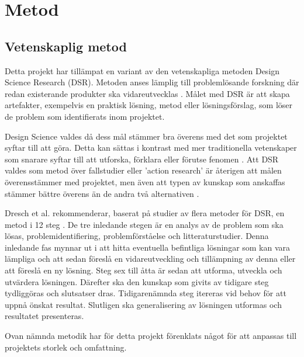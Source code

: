 \section{Metod} %
\label{sec:metod}
    
    \subsection{Vetenskaplig metod} %
    \label{sub:vetenskaplig_metod}
    	Detta projekt har tillämpat en variant av den vetenskapliga metoden Design Science Research (DSR). Metoden anses lämplig till problemlösande forskning där redan existerande produkter ska vidareutvecklas \cite{dsr}. Målet med DSR är att skapa artefakter, exempelvis en praktisk lösning, metod eller lösningsförslag, som löser de problem som identifierats inom projektet. \bigskip

        Design Science valdes då dess mål stämmer bra överens med det som projektet syftar till att göra. Detta kan sättas i kontrast med mer traditionella vetenskaper som snarare syftar till att utforska, förklara eller förutse fenomen \cite[s.~13]{dsr}. Att DSR valdes som metod över fallstudier eller 'action research' är återigen att målen överensstämmer med projektet, men även att typen av kunskap som anskaffas stämmer bättre överens än de andra två alternativen \cite[s.~95]{dsr}.\bigskip

    	Dresch et al. rekommenderar, baserat på studier av flera metoder för DSR, en metod i 12 steg \cite[s.~118--126]{dsr}. De tre inledande stegen är en analys av de problem som ska lösas, problemidentifiering, problemförståelse och litteraturstudier. Denna inledande fas mynnar ut i att hitta eventuella befintliga lösningar som kan vara lämpliga och att sedan föreslå en vidareutveckling och tillämpning av denna eller att föreslå en ny lösning. Steg sex till åtta är sedan att utforma, utveckla och utvärdera lösningen. Därefter ska den kunskap som givits av tidigare steg tydliggöras och slutsatser dras. Tidigarenämnda steg itereras vid behov för att uppnå önskat resultat. Slutligen ska generalisering av lösningen utformas och resultatet presenteras. \bigskip

    	Ovan nämnda metodik har för detta projekt förenklats något för att anpassas till projektets storlek och omfattning.

